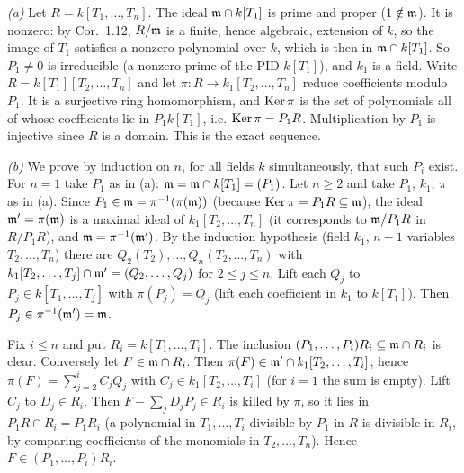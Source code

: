 \documentclass[11pt]{article}
\begin{document}
\pf
\emph{(a)} Let $R=k[T_1,\dots,T_n]$. The ideal $\mathfrak m\cap k[T_1]$ is prime and proper ($1\notin\mathfrak m$). It is nonzero: by Cor.~1.12, $R/\mathfrak m$ is a finite, hence algebraic, extension of $k$, so the image of $T_1$ satisfies a nonzero polynomial over $k$, which is then in $\mathfrak m\cap k[T_1]$. So $P_1\neq0$ is irreducible (a nonzero prime of the PID $k[T_1]$), and $k_1$ is a field. Write $R=k[T_1][T_2,\dots,T_n]$ and let $\pi:R\to k_1[T_2,\dots,T_n]$ reduce coefficients modulo $P_1$. It is a surjective ring homomorphism, and $\operatorname{Ker}\pi$ is the set of polynomials all of whose coefficients lie in $P_1k[T_1]$, i.e. $\operatorname{Ker}\pi=P_1R$. Multiplication by $P_1$ is injective since $R$ is a domain. This is the exact sequence.

\emph{(b)} We prove by induction on $n$, for all fields $k$ simultaneously, that such $P_i$ exist. For $n=1$ take $P_1$ as in (a): $\mathfrak m=\mathfrak m\cap k[T_1]=(P_1)$. Let $n\ge2$ and take $P_1$, $k_1$, $\pi$ as in (a). Since $P_1\in\mathfrak m=\pi^{-1}(\pi(\mathfrak m))$ (because $\operatorname{Ker}\pi=P_1R\subseteq\mathfrak m$), the ideal $\mathfrak m'=\pi(\mathfrak m)$ is a maximal ideal of $k_1[T_2,\dots,T_n]$ (it corresponds to $\mathfrak m/P_1R$ in $R/P_1R$), and $\mathfrak m=\pi^{-1}(\mathfrak m')$. By the induction hypothesis (field $k_1$, $n-1$ variables $T_2,\dots,T_n$) there are $Q_2(T_2),\dots,Q_n(T_2,\dots,T_n)$ with $k_1[T_2,\dots,T_j]\cap\mathfrak m'=(Q_2,\dots,Q_j)$ for $2\le j\le n$. Lift each $Q_j$ to $P_j\in k[T_1,\dots,T_j]$ with $\pi(P_j)=Q_j$ (lift each coefficient in $k_1$ to $k[T_1]$). Then $P_j\in\pi^{-1}(\mathfrak m')=\mathfrak m$.

Fix $i\le n$ and put $R_i=k[T_1,\dots,T_i]$. The inclusion $(P_1,\dots,P_i)R_i\subseteq\mathfrak m\cap R_i$ is clear. Conversely let $F\in\mathfrak m\cap R_i$. Then $\pi(F)\in\mathfrak m'\cap k_1[T_2,\dots,T_i]$, hence $\pi(F)=\sum_{j=2}^iC_jQ_j$ with $C_j\in k_1[T_2,\dots,T_i]$ (for $i=1$ the sum is empty). Lift $C_j$ to $D_j\in R_i$. Then $F-\sum_jD_jP_j\in R_i$ is killed by $\pi$, so it lies in $P_1R\cap R_i=P_1R_i$ (a polynomial in $T_1,\dots,T_i$ divisible by $P_1$ in $R$ is divisible in $R_i$, by comparing coefficients of the monomials in $T_2,\dots,T_n$). Hence $F\in(P_1,\dots,P_i)R_i$.
\end{document}
